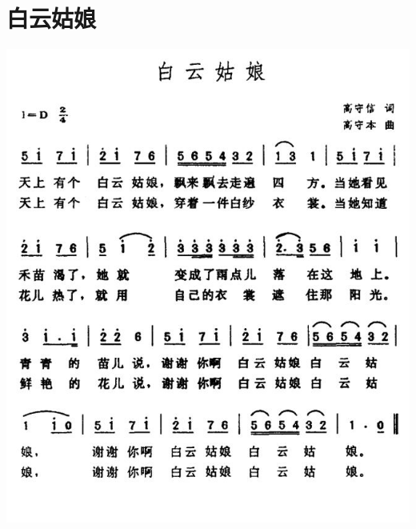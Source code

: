 \documentclass[cn,pad,chinese,chinesefont=nofont]{elegantbook}
\begin{document}
\section{白云姑娘}
    \includegraphics[width=\textwidth]{dongxiao/日本-白云姑娘.jpg}
\end{document}
